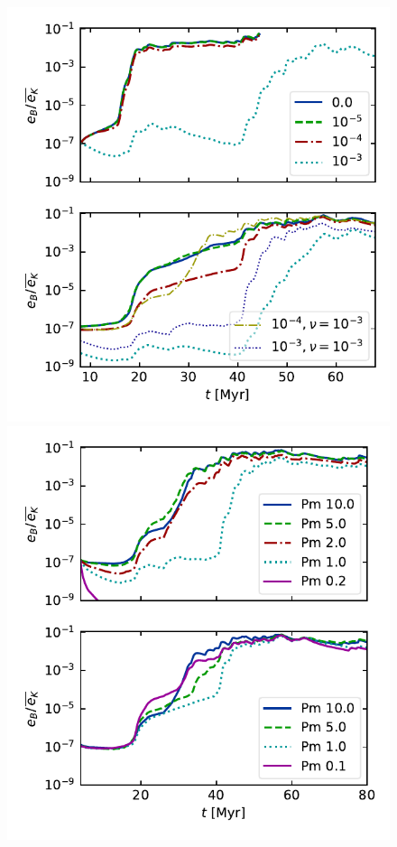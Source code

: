 \documentclass[preprint2]{aastex63}
\begin{document}
\begin{figure}
  \includegraphics[trim=0.5cm 0.0cm 0.3cm 0.0cm, clip=true,width=\columnwidth]{figs/1pc-eB-nu0.pdf}
  \includegraphics[trim=0.5cm 0.0cm 0.3cm 0.0cm, clip=true,width=\columnwidth]{figs/1pc-eB-nu5.pdf}\\

\end{figure}
\end{document}
